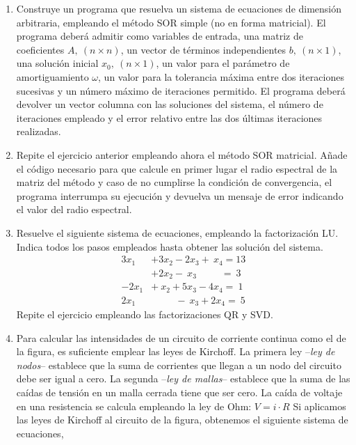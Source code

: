\begin{enumerate}
\item Construye un programa que resuelva un sistema de ecuaciones de dimensión arbitraria, empleando el método SOR  simple (no en forma matricial). El programa deberá admitir como variables de entrada, una matriz de coeficientes $ A,\ (n\times n)$, un vector de términos independientes $b,\ (n\times 1)$, una solución inicial $x_0 ,\ (n\times 1)$, un valor para el parámetro de amortiguamiento $\omega$, un valor para la tolerancia máxima entre dos iteraciones sucesivas y un número máximo de iteraciones permitido. El programa deberá devolver un vector columna con las soluciones del sistema, el número de iteraciones empleado y el error relativo entre las dos últimas iteraciones realizadas.

\item Repite el ejercicio anterior empleando ahora el método SOR matricial. Añade el código necesario para que calcule en primer lugar el radio espectral de la matriz del método y caso de no cumplirse  la condición de convergencia, el programa interrumpa su ejecución y devuelva un mensaje de error indicando el valor del radio espectral.


\item Resuelve el siguiente sistema de ecuaciones, empleando la factorización LU. Indica todos los pasos empleados hasta obtener las solución del sistema.
\begin{align*}
3x_1&+3x_2-2x_3 +\ x_4= 13\\
 &+2x_2-\ x_3  \hspace{30pt} =\ 3\\
-2x_1&+\ x_2 + 5x_3 -4x_4=\ 1\\
2x_1& \hspace{30pt} -\ x_3 +2x_4 =\ 5
\end{align*}
Repite el ejercicio empleando las factorizaciones QR y SVD.

\item Para calcular las intensidades de un circuito de corriente continua como el de la figura, es suficiente emplear las leyes de Kirchoff. La primera ley --\emph{ley de nodos}-- establece que la suma de corrientes que llegan a un nodo del circuito debe ser igual a cero.
La segunda --\emph{ley de mallas}-- establece que la suma de las caídas de tensión en un malla cerrada tiene que ser cero. La caída de voltaje en una resistencia se calcula empleando la ley de Ohm: $V = i\cdot R$
Si aplicamos las leyes de Kirchoff al circuito de la figura, obtenemos  el siguiente sistema de ecuaciones,


\end{enumerate}
